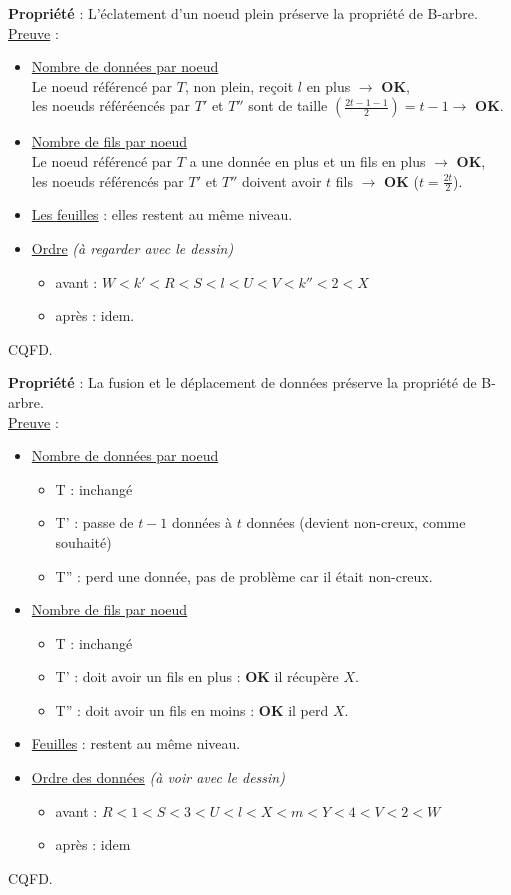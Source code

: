 \documentclass{article}
\begin{document}
\noindent \textbf{Propriété} : L'éclatement d'un noeud plein préserve la propriété de B-arbre. \\
\underline{Preuve} :
\begin{itemize}
\item \underline{Nombre de données par noeud} \\
Le noeud référencé par $T$, non plein, reçoit $l$ en plus $\rightarrow$ \textbf{OK},\\
les noeuds référéencés par $T'$ et $T''$ sont de taille $\left(\frac{2t-1-1}{2}\right) = t-1 \rightarrow$ 
\textbf{OK}.
\item \underline{Nombre de fils par noeud} \\
Le noeud référencé par $T$ a une donnée en plus et un fils en plus $\rightarrow$ \textbf{OK}, \\
les noeuds référencés par $T'$ et $T''$ doivent avoir $t$ fils $\rightarrow$ \textbf{OK} ($t=\frac{2t}{2}$).
\item \underline{Les feuilles} : elles restent au même niveau.
\item \underline{Ordre} \textit{(à regarder avec le dessin)}
	\begin{itemize}
	\item avant : $W < k' < R < S < l < U < V < k'' < 2 < X$
	\item après : idem. \\
	\end{itemize}
\end{itemize}
CQFD.

\noindent \textbf{Propriété} : La fusion et le déplacement de données préserve la propriété de B-arbre. \\
\underline{Preuve} : 
\begin{itemize}
\item \underline{Nombre de données par noeud}
	\begin{itemize}
	\item T : inchangé
	\item T' : passe de $t-1$ données à $t$ données (devient non-creux, comme souhaité)
	\item T'' : perd une donnée, pas de problème car il était non-creux.
	\end{itemize}
\item \underline{Nombre de fils par noeud}
	\begin{itemize}
	\item T : inchangé
	\item T' : doit avoir un fils en plus : \textbf{OK} il récupère $X$.
	\item T'' : doit avoir un fils en moins : \textbf{OK} il perd $X$.
	\end{itemize}
\item \underline{Feuilles} : restent au même niveau.
\item \underline{Ordre des données} \textit{(à voir avec le dessin)}
	\begin{itemize}
	\item avant : $R<1<S<3<U<l<X<m<Y<4<V<2<W$
	\item après : idem
	\end{itemize}
\end{itemize}
CQFD.
\end{document}
